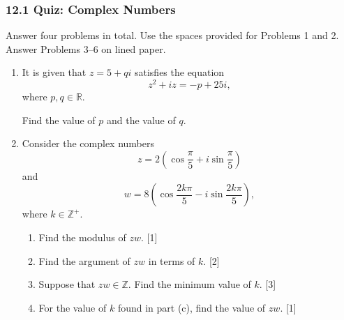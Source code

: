 \documentclass[12pt, twoside]{article}
\begin{document}
\subsubsection*{12.1 Quiz: Complex Numbers}

Answer four problems in total. Use the spaces provided for Problems 1 and 2.
Answer Problems 3--6 on lined paper.

\begin{enumerate}[itemsep=0.15cm]

\item[1.] 

It is given that $z = 5 + qi$ satisfies the equation
\[
z^2 + iz = -p + 25i,
\]
where $p, q \in \mathbb{R}$.

Find the value of $p$ and the value of $q$.


\newpage

\item[2.] 

Consider the complex numbers
\[
z = 2\left(\cos\frac{\pi}{5} + i\sin\frac{\pi}{5}\right)
\]
and
\[
w = 8\left(\cos\frac{2k\pi}{5} - i\sin\frac{2k\pi}{5}\right),
\]
where $k \in \mathbb{Z}^{+}$.

\begin{enumerate}[itemsep=0.15cm]
  \item Find the modulus of $zw$. \hfill [1]
  \item Find the argument of $zw$ in terms of $k$. \hfill [2]
  \item Suppose that $zw \in \mathbb{Z}$. Find the minimum value of $k$. \hfill [3]
  \item For the value of $k$ found in part (c), find the value of $zw$. \hfill [1]
\end{enumerate}



\end{enumerate}
\end{document}
